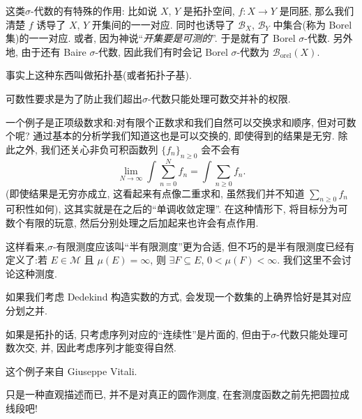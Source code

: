 \begin{alterendnote}
    这类$\sigma $-代数的有特殊的作用: 比如说 $X$, $Y$ 是拓扑空间, $f:X\to Y$ 是同胚, 那么我们清楚 $f$ 诱导了 $X$, $Y$ 开集间的一一对应. 同时也诱导了 $\mathcal B_X$, $\mathcal B_Y$ 中集合(称为 Borel 集)的一一对应. 或者, 因为神说``\emph{开集要是可测的}''. 于是就有了 Borel $\sigma $-代数. 另外地, 由于还有 Baire $\sigma $-代数, 因此我们有时会记 Borel $\sigma $-代数为 $\mathcal{B}_{\mathrm{orel}}(X)$.
\end{alterendnote}
\begin{alterendnote}
    事实上这种东西叫做拓扑基(或者拓扑子基).
\end{alterendnote}
\begin{alterendnote}
    可数性要求是为了防止我们超出$\sigma $-代数只能处理可数交并补的权限.
\end{alterendnote}
\begin{alterendnote}
    一个例子是正项级数求和:对有限个正数求和我们自然可以交换求和顺序, 但对可数个呢? 通过基本的分析学我们知道这也是可以交换的, 即使得到的结果是无穷. 除此之外, 我们还关心非负可积函数列 $\{f_n\}_{n\geqslant 0}$ 会不会有\[\lim_{N \to \infty} \int \sum_{n=0}^N f_n = \int\sum_{n\geqslant 0}f_n.\](即使结果是无穷亦成立, 这看起来有点像二重求和, 虽然我们并不知道 $\sum_{n\geqslant 0} f_n$ 可积性如何), 这其实就是在之后的``单调收敛定理''. 在这种情形下, 将目标分为可数个有限的玩意, 然后分别处理之后加起来也许会有点作用.
\end{alterendnote}
\begin{alterendnote}
    这样看来,$\sigma $-有限测度应该叫``半有限测度''更为合适, 但不巧的是半有限测度已经有定义了:若 $E\in\mathcal M$ 且 $\mu (E)=\infty$, 则 $\exists F\subseteq E$, $0<\mu (F)<\infty$. 我们这里不会讨论这种测度.
\end{alterendnote}
\begin{alterendnote}
    如果我们考虑 Dedekind 构造实数的方式, 会发现一个数集的上确界恰好是其对应分划之并.
\end{alterendnote}
\begin{alterendnote}
    如果是拓扑的话, 只考虑序列对应的``连续性''是片面的, 但由于$\sigma $-代数只能处理可数次交, 并, 因此考虑序列才能变得自然.
\end{alterendnote}
\begin{alterendnote}
    这个例子来自 Giuseppe Vitali.
\end{alterendnote}
\begin{alterendnote}
    只是一种直观描述而已, 并不是对真正的圆作测度, 在套测度函数之前先把圆拉成线段吧!
\end{alterendnote}
